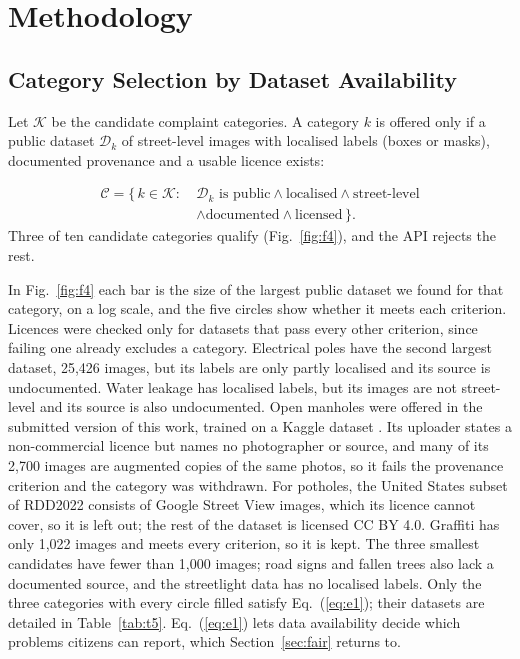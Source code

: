 \documentclass{ieeeaccess}
\begin{document}
\section{Methodology}\label{sec:method}

\subsection{Category Selection by Dataset Availability}

Let $\mathcal{K}$ be the candidate complaint categories. A category $k$ is offered only if a public dataset $\mathcal{D}_k$ of street-level images with localised labels (boxes or masks), documented provenance and a usable licence exists:

\begin{equation}
\begin{aligned}
\mathcal{C}=\{\,k\in\mathcal{K} :\ &\mathcal{D}_k \text{ is public} \wedge \text{localised} \wedge \text{street-level}\\
&\wedge \text{documented} \wedge \text{licensed}\,\}.
\end{aligned}
\label{eq:e1}
\end{equation}
\noindent Three of ten candidate categories qualify (Fig.~\ref{fig:f4}), and the API rejects the rest.

In Fig.~\ref{fig:f4} each bar is the size of the largest public dataset we found for that category, on a log scale, and the five circles show whether it meets each criterion. Licences were checked only for datasets that pass every other criterion, since failing one already excludes a category. Electrical poles have the second largest dataset, 25,426 images, but its labels are only partly localised and its source is undocumented. Water leakage has localised labels, but its images are not street-level and its source is also undocumented. Open manholes were offered in the submitted version of this work, trained on a Kaggle dataset \cite{b40}. Its uploader states a non-commercial licence but names no photographer or source, and many of its 2,700 images are augmented copies of the same photos, so it fails the provenance criterion and the category was withdrawn. For potholes, the United States subset of RDD2022 consists of Google Street View images, which its licence cannot cover, so it is left out; the rest of the dataset is licensed CC BY 4.0. Graffiti has only 1,022 images and meets every criterion, so it is kept. The three smallest candidates have fewer than 1,000 images; road signs and fallen trees also lack a documented source, and the streetlight data has no localised labels. Only the three categories with every circle filled satisfy Eq.~(\ref{eq:e1}); their datasets are detailed in Table~\ref{tab:t5}. Eq.~(\ref{eq:e1}) lets data availability decide which problems citizens can report, which Section~\ref{sec:fair} returns to.
\end{document}
